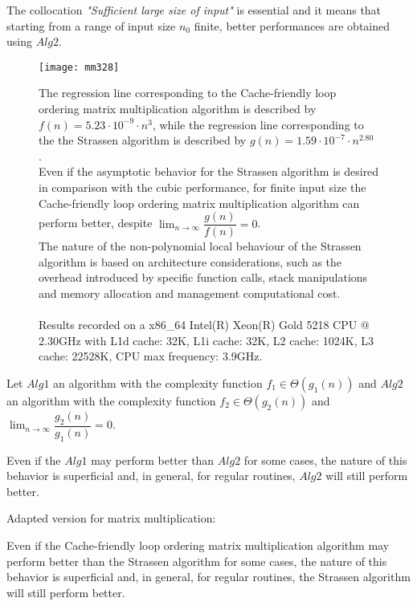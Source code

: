 The collocation
\textit{"Sufficient large size of input"} is essential and it means that starting from a range of input size $n_{0}$ finite, better performances are obtained using $Alg2$.


\begin{figure}[H]
\centering
\texttt{[image: mm328]}
\caption{The regression line corresponding to the Cache-friendly loop ordering matrix multiplication algorithm is described by $f(n) = 5.23 \cdot 10^{-9} \cdot n^{3} $, while the regression line corresponding to the the Strassen algorithm is described by $g(n) = 1.59 \cdot 10^{-7} \cdot n^{2.80} $ . \\  Even if the asymptotic behavior for the Strassen algorithm is desired in comparison with the cubic performance, for finite input size the Cache-friendly loop ordering matrix multiplication algorithm can perform better, despite $\lim_{n\to\infty} \dfrac{g(n)}{f(n)} = 0$.  \\ The nature of the non-polynomial local behaviour of the Strassen algorithm is based on architecture considerations, such as the overhead introduced by specific function calls, stack manipulations and memory allocation and management computational cost. \\ \\ Results recorded on a x86\_64 Intel(R) Xeon(R) Gold 5218 CPU @ 2.30GHz with L1d cache: 32K, L1i cache: 32K, L2 cache: 1024K, L3 cache: 22528K, CPU max frequency: 3.9GHz.}
\end{figure}


\begin{pitfall}
Let $Alg1$ an algorithm with the complexity function $f_{1} \in \Theta(g_1(n))$  and $Alg2$ an algorithm with the complexity function $f_{2} \in \Theta(g_2(n))$ and $\lim_{n\to\infty} \dfrac{g_2(n)}{g_1(n)} = 0$.

Even if the $Alg1$ may perform better than $Alg2$ for some cases, the nature of this behavior is superficial and, in general, for regular routines, $Alg2$ will still perform better.
\end{pitfall}

\begin{pitfall}
Adapted version for matrix multiplication:

Even if the Cache-friendly loop ordering matrix multiplication algorithm may perform better than the Strassen algorithm for some cases, the nature of this behavior is superficial and, in general, for regular routines, the Strassen algorithm will still perform better.
\end{pitfall}

